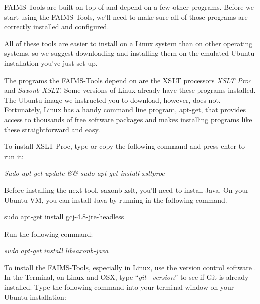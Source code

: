 
FAIMS-Tools are built on top of and depend on a few other programs. Before we start using the FAIMS-Tools, we'll need to make sure all of those programs are correctly installed and configured.

All of these tools are easier to install on a Linux system than on other operating systems, so we suggest downloading and installing them on the emulated Ubuntu installation you've just set up.

The programs the FAIMS-Tools depend on are the XSLT processors {\em XSLT Proc} and {\em Saxonb-XSLT}. Some versions of Linux already have these programs installed. The Ubuntu image we instructed you to download, however, does not. Fortunately, Linux has a handy command line program, apt-get, that provides access to thousands of free software packages and makes installing programs like these straightforward and easy.


To install XSLT Proc, type or copy the following command and press enter to run it:

{\em Sudo apt-get update && sudo apt-get install xsltproc}



Before installing the next tool, saxonb-xslt, you'll need to install Java. On your Ubuntu VM, you can install Java by running in the following command.

sudo apt-get install gcj-4.8-jre-headless



Run the following command:

{\em sudo apt-get install libsaxonb-java}


To install the FAIMS-Tools, especially in Linux, use the version control software \from[url9]. In the Terminal, on Linux and OSX, type “{\em git --version}” to see if Git is already installed. Type the following command into your terminal window on your Ubuntu installation:

